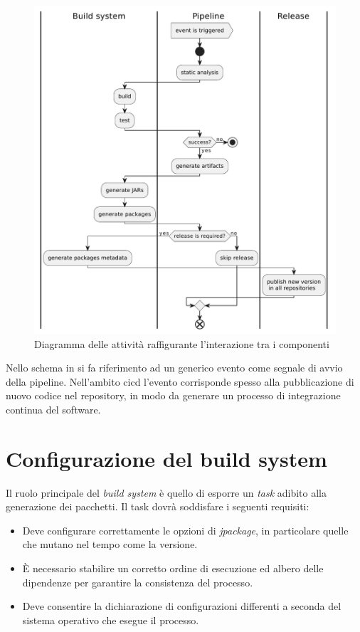 \begin{figure}[htb]
	\centering
	\includegraphics[width=.9\linewidth]{figures/activity-interaction-diagram.pdf}
	\caption{Diagramma delle attività raffigurante l'interazione tra i componenti}
	\label{fig:activity-interaction-diagram}
\end{figure}

Nello schema in  si fa riferimento ad un generico evento come segnale di avvio della pipeline. Nell'ambito \ac{cicd} l'evento corrisponde spesso alla pubblicazione di nuovo codice nel repository, in modo da generare un processo di integrazione continua del software.

\section{Configurazione del build system}

Il ruolo principale del \textit{build system} è quello di esporre un \textit{task} adibito alla generazione dei pacchetti. Il task dovrà soddisfare i seguenti requisiti:
\begin{itemize}
	\item Deve configurare correttamente le opzioni di \textit{jpackage}, in particolare quelle che mutano nel tempo come la versione.
	\item È necessario stabilire un corretto ordine di esecuzione ed albero delle dipendenze per garantire la consistenza del processo.
	\item Deve consentire la dichiarazione di configurazioni differenti a seconda del sistema operativo che esegue il processo.
\end{itemize}

